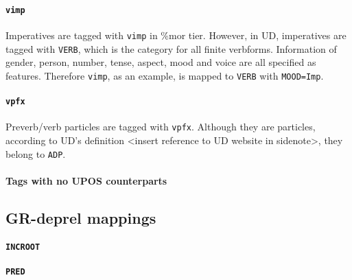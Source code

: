 \paragraph{\texttt{vimp}}
Imperatives are tagged with \texttt{vimp} in \%mor tier. However, in UD, imperatives are tagged with \texttt{VERB}, which is the category for all finite verbforms. Information of gender, person, number, tense, aspect, mood and voice are all specified as features. Therefore \texttt{vimp}, as an example, is mapped to \texttt{VERB} with \texttt{MOOD=Imp}.\\

\paragraph{\texttt{vpfx}}
Preverb/verb particles are tagged with \texttt{vpfx}. Although they are particles, according to UD's definition <insert reference to UD website in sidenote>, they belong to \texttt{ADP}.\\

\paragraph{Tags with no UPOS counterparts}


\subsection{GR-deprel mappings}

\paragraph{\texttt{INCROOT}}

\paragraph{\texttt{PRED}}



